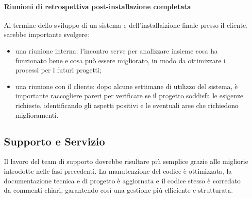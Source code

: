             \paragraph{Riunioni di retrospettiva post-installazione completata}
            Al termine dello sviluppo di un sistema e dell'installaizione finale presso il cliente, sarebbe importante svolgere:
            \begin{itemize}
                \item una riunione interna: l'incontro serve per analizzare insieme cosa ha funzionato bene e cosa può essere migliorato,
                in modo da ottimizzare i processi per i futuri progetti;
                \item una riunione con il cliente: dopo alcune settimane di utilizzo del sistema, è importante raccogliere pareri
                per verificare se il progetto soddisfa le
                esigenze richieste, identificando gli aspetti positivi e le eventuali aree che richiedono miglioramenti.
            \end{itemize}           

    \subsection{Supporto e Servizio}
    Il lavoro del team di supporto dovrebbe risultare più semplice grazie alle migliorie introdotte nelle fasi precedenti.
    La manutenzione del codice è ottimizzata, la documentazione tecnica e di progetto è aggiornata e il codice stesso
    è corredato da commenti chiari, garantendo così una gestione più efficiente e strutturata.
    
